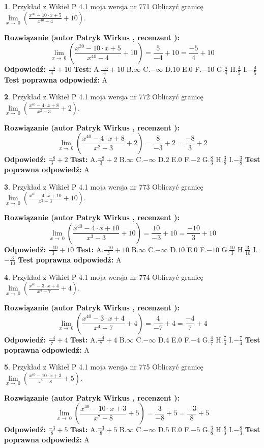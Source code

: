 \documentclass[12pt, a4paper]{article}
\theoremstyle{definition} %
\newtheorem{zad}{}
\newcommand{\zadStart}[1]{\begin{zad}#1\newline}
\newcommand{\zadStop}{\end{zad}}
\newcommand{\rozwStart}[2]{\noindent \textbf{Rozwiązanie (autor #1 , recenzent #2): }\newline}
\newcommand{\rozwStop}{\newline}
\newcommand{\odpStart}{\noindent \textbf{Odpowiedź:}\newline}
\newcommand{\odpStop}{\newline}
\newcommand{\testStart}{\noindent \textbf{Test:}\newline}
\newcommand{\testStop}{\newline}
\newcommand{\kluczStart}{\noindent \textbf{Test poprawna odpowiedź:}\newline}
\newcommand{\kluczStop}{\newline}
\begin{document}
\zadStart{Przykład z Wikieł P 4.1 moja wersja nr 771}
Obliczyć granicę $\lim\limits_{x\to\ 0}(\frac{x^{39}-10 \cdot x +5}{x^{40}-4}+10)$.
\zadStop
\rozwStart{Patryk Wirkus}{}
$$\lim\limits_{x\to\ 0}(\frac{x^{39}-10 \cdot x +5}{x^{40}-4}+10)=\frac{5}{-4}+10=\frac{-5}{4}+10$$
\rozwStop
\odpStart
$\frac{-5}{4}+10$
\odpStop
\testStart
A.$\frac{-5}{4}+10$
B.$\infty$
C.$-\infty$
D.$10$
E.$0$
F.$-10$
G.$\frac{5}{4}$
H.$\frac{4}{5}$
I.$-\frac{4}{5}$
\testStop
\kluczStart
A
\kluczStop



\zadStart{Przykład z Wikieł P 4.1 moja wersja nr 772}
Obliczyć granicę $\lim\limits_{x\to\ 0}(\frac{x^{40}-4 \cdot x +8}{x^{2}-3}+2)$.
\zadStop
\rozwStart{Patryk Wirkus}{}
$$\lim\limits_{x\to\ 0}(\frac{x^{40}-4 \cdot x +8}{x^{2}-3}+2)=\frac{8}{-3}+2=\frac{-8}{3}+2$$
\rozwStop
\odpStart
$\frac{-8}{3}+2$
\odpStop
\testStart
A.$\frac{-8}{3}+2$
B.$\infty$
C.$-\infty$
D.$2$
E.$0$
F.$-2$
G.$\frac{8}{3}$
H.$\frac{3}{8}$
I.$-\frac{3}{8}$
\testStop
\kluczStart
A
\kluczStop



\zadStart{Przykład z Wikieł P 4.1 moja wersja nr 773}
Obliczyć granicę $\lim\limits_{x\to\ 0}(\frac{x^{40}-4 \cdot x +10}{x^{3}-3}+10)$.
\zadStop
\rozwStart{Patryk Wirkus}{}
$$\lim\limits_{x\to\ 0}(\frac{x^{40}-4 \cdot x +10}{x^{3}-3}+10)=\frac{10}{-3}+10=\frac{-10}{3}+10$$
\rozwStop
\odpStart
$\frac{-10}{3}+10$
\odpStop
\testStart
A.$\frac{-10}{3}+10$
B.$\infty$
C.$-\infty$
D.$10$
E.$0$
F.$-10$
G.$\frac{10}{3}$
H.$\frac{3}{10}$
I.$-\frac{3}{10}$
\testStop
\kluczStart
A
\kluczStop



\zadStart{Przykład z Wikieł P 4.1 moja wersja nr 774}
Obliczyć granicę $\lim\limits_{x\to\ 0}(\frac{x^{40}-3 \cdot x +4}{x^{4}-7}+4)$.
\zadStop
\rozwStart{Patryk Wirkus}{}
$$\lim\limits_{x\to\ 0}(\frac{x^{40}-3 \cdot x +4}{x^{4}-7}+4)=\frac{4}{-7}+4=\frac{-4}{7}+4$$
\rozwStop
\odpStart
$\frac{-4}{7}+4$
\odpStop
\testStart
A.$\frac{-4}{7}+4$
B.$\infty$
C.$-\infty$
D.$4$
E.$0$
F.$-4$
G.$\frac{4}{7}$
H.$\frac{7}{4}$
I.$-\frac{7}{4}$
\testStop
\kluczStart
A
\kluczStop



\zadStart{Przykład z Wikieł P 4.1 moja wersja nr 775}
Obliczyć granicę $\lim\limits_{x\to\ 0}(\frac{x^{40}-10 \cdot x +3}{x^{7}-8}+5)$.
\zadStop
\rozwStart{Patryk Wirkus}{}
$$\lim\limits_{x\to\ 0}(\frac{x^{40}-10 \cdot x +3}{x^{7}-8}+5)=\frac{3}{-8}+5=\frac{-3}{8}+5$$
\rozwStop
\odpStart
$\frac{-3}{8}+5$
\odpStop
\testStart
A.$\frac{-3}{8}+5$
B.$\infty$
C.$-\infty$
D.$5$
E.$0$
F.$-5$
G.$\frac{3}{8}$
H.$\frac{8}{3}$
I.$-\frac{8}{3}$
\testStop
\kluczStart
A
\kluczStop
\end{document}
